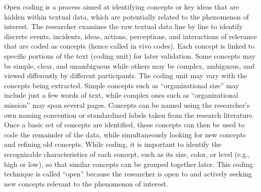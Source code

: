 Open coding is a process aimed at identifying concepts or key ideas that are hidden within textual data, which are potentially related to the phenomenon of interest. The researcher examines the raw textual data line by line to identify discrete events, incidents, ideas, actions, perceptions, and interactions of relevance that are coded as concepts (hence called in vivo codes). Each concept is linked to specific portions of the text (coding unit) for later validation. Some concepts may be simple, clear, and unambiguous while others may be complex, ambiguous, and viewed differently by different participants. The coding unit may vary with the concepts being extracted. Simple concepts such as ``organizational size'' may include just a few words of text, while complex ones such as ``organizational mission'' may span several pages. Concepts can be named using the researcher’s own naming convention or standardized labels taken from the research literature. Once a basic set of concepts are identified, these concepts can then be used to code the remainder of the data, while simultaneously looking for new concepts and refining old concepts. While coding, it is important to identify the recognizable characteristics of each concept, such as its size, color, or level (e.g., high or low), so that similar concepts can be grouped together later. This coding technique is called ``open'' because the researcher is open to and actively seeking new concepts relevant to the phenomenon of interest.

